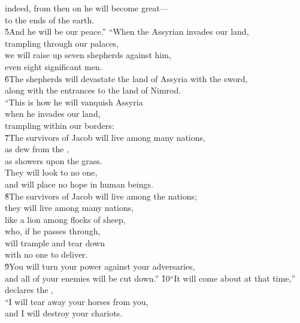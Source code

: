 \begin{poetry}
\poemll    indeed, from then on he will become great--- \\
\poemlll       to the ends of the earth. \\
\poeml \v{5}And he will be our peace.''
\poeml ``When the Assyrian invades our land, \\
\poemll    trampling through our palaces, \\
\poeml we will raise up seven shepherds against him, \\
\poemll    even eight significant men. \\
\poeml \v{6}The shepherds will devastate the land of Assyria with the sword, \\
\poemll    along with the entrances to the land of Nimrod. \\
\poeml ``This is how he will vanquish Assyria \\
\poemll    when he invades our land, \\
\poemlll       trampling within our borders: \\
\poeml \v{7}The survivors of Jacob will live among many nations, \\
\poemll    as dew from the , \\
\poemlll       as showers upon the grass. \\
\poeml They will look to no one, \\
\poemll    and will place no hope in human beings. \\
\poeml \v{8}The survivors of Jacob will live among the nations; \\
\poemll    they will live among many nations, \\
\poemlll       like a lion among flocks of sheep, \\
\poeml who, if he passes through, \\
\poemll    will trample and tear down \\
\poemlll       with no one to deliver. \\
\poeml \v{9}You will turn your power against your adversaries, \\
\poemll    and all of your enemies will be cut down.''
\poeml \v{10}``It will come about at that time,'' declares the , \\
\poemll    ``I will tear away your horses from you, \\
\poemlll       and I will destroy your chariots. \\

\end{poetry}
